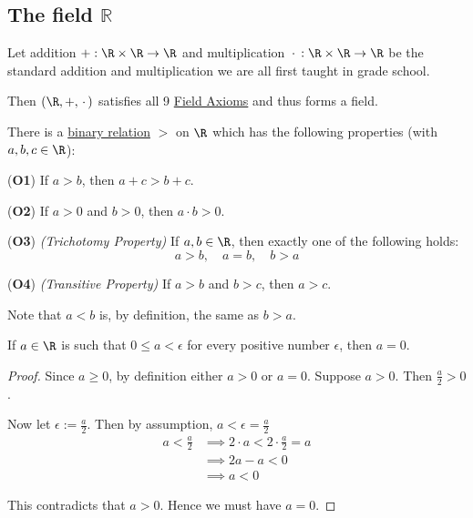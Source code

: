 \subsection{The field $\mathbb R$}\label{ff004fd}

\label{bf61f02}

Let addition $+:\R\times\R\to\R$ and multiplication $\,\cdot\,:\R\times\R\to\R$
be the standard addition and multiplication we are all first taught in grade
school.

Then $(\R,+,\,\cdot\,)$ satisfies all 9 \href{aec6040}{Field Axioms} and thus
forms a field.

\label{d49c63e}

There is a \href{a3a60e1}{binary relation} $>$ on $\R$ which has the following
properties (with $a,b,c\in\R$):

\begin{enumerati}
  \item [(\textbf{O1})] If $a>b$, then $a+c>b+c$.
  \item [(\textbf{O2})] If $a>0$ and $b>0$, then $a\cdot b>0$.
  \item [(\textbf{O3})] \textit{(Trichotomy Property)} If $a,b\in\R$, then
  exactly one of the following holds:
  $$
    a>b,\quad a=b,\quad b>a
  $$
  \item [(\textbf{O4})] \textit{(Transitive Property)} If $a>b$ and $b>c$, then
  $a>c$.
\end{enumerati}

Note that $a<b$ is, by definition, the same as $b>a$.

\Theorem{}\label{b069294}

If $a\in\R$ is such that $0\leq a<\epsilon$ for every positive number
$\epsilon$, then $a=0$.

\begin{proof}
  Since $a\geq0$, by definition either $a>0$ or $a=0$. Suppose $a>0$. Then
  $\frac a2>0$.

  Now let $\epsilon:=\frac a2$. Then by assumption, $a<\epsilon=\frac a2$
  \begin{align*}
    a<\frac a2 &\implies 2\cdot a<2\cdot\frac a2=a \\
               &\implies 2a-a<0                    \\
               &\implies a<0
  \end{align*}

  This contradicts that $a>0$. Hence we must have $a=0$.
\end{proof}

